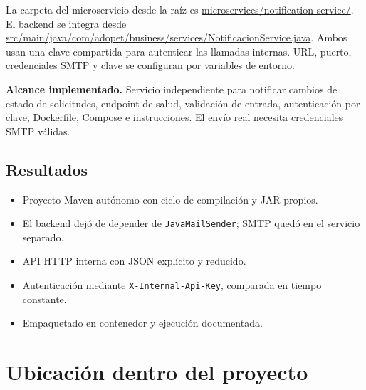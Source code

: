\documentclass[11pt,a4paper]{article}
\newcommand{\pathcode}[1]{\small\url{#1}}\newcommand{\envvar}[1]{\small\url{#1}}
\newcommand{\callout}[1]{\begin{center}\colorbox{Pale}{\parbox{0.93\linewidth}{\vspace{5pt}#1\vspace{5pt}}}\end{center}}
\begin{document}
La carpeta del microservicio desde la raíz es \pathcode{microservices/notification-service/}. El backend se integra desde \pathcode{src/main/java/com/adopet/business/services/NotificacionService.java}. Ambos usan una clave compartida para autenticar las llamadas internas. URL, puerto, credenciales SMTP y clave se configuran por variables de entorno.

\callout{\textbf{Alcance implementado.} Servicio independiente para notificar cambios de estado de solicitudes, endpoint de salud, validación de entrada, autenticación por clave, Dockerfile, Compose e instrucciones. El envío real necesita credenciales SMTP válidas.}
\subsection{Resultados}
\begin{itemize}
\item Proyecto Maven autónomo con ciclo de compilación y JAR propios.
\item El backend dejó de depender de \texttt{JavaMailSender}; SMTP quedó en el servicio separado.
\item API HTTP interna con JSON explícito y reducido.
\item Autenticación mediante \texttt{X-Internal-Api-Key}, comparada en tiempo constante.
\item Empaquetado en contenedor y ejecución documentada.
\end{itemize}

\section{Ubicación dentro del proyecto}
\end{document}

